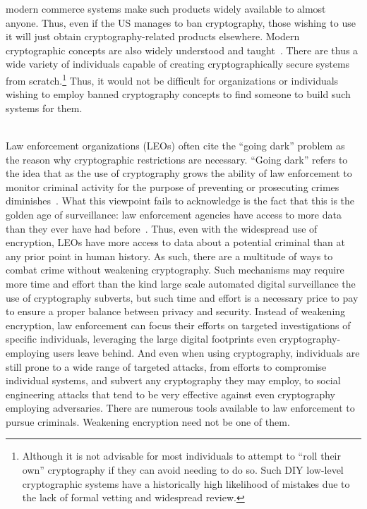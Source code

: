 \begin{packed_desc}
  modern commerce systems make such products widely available to
  almost anyone. Thus, even if the US manages to ban cryptography,
  those wishing to use it will just obtain cryptography-related
  products elsewhere. Modern cryptographic concepts are also widely
  understood and taught~\cite{schneier2010crypto}. There are thus a
  wide variety of individuals capable of creating cryptographically
  secure systems from scratch.\footnote{Although it is not advisable
    for most individuals to attempt to ``roll their own'' cryptography
    if they can avoid needing to do so. Such DIY low-level
    cryptographic systems have a historically high likelihood of
    mistakes due to the lack of formal vetting and widespread review.}
  Thus, it would not be difficult for organizations or individuals
  wishing to employ banned cryptography concepts to find someone
  to build such systems for them.
\item[Better Options] \hfill \\ Law enforcement organizations (LEOs)
  often cite the ``going dark'' problem as the reason why
  cryptographic restrictions are necessary. ``Going dark'' refers to
  the idea that as the use of cryptography grows the ability of law
  enforcement to monitor criminal activity for the purpose of
  preventing or prosecuting crimes
  diminishes~\cite{anderson2013}. What this viewpoint fails to
  acknowledge is the fact that this is the golden age of surveillance:
  law enforcement agencies have access to more data than they ever
  have had before~\cite{swire2011}. Thus, even with the widespread use
  of encryption, LEOs have more access to data about a potential
  criminal than at any prior point in human history. As such, there
  are a multitude of ways to combat crime without weakening
  cryptography. Such mechanisms may require more time and effort than
  the kind large scale automated digital surveillance the use of
  cryptography subverts, but such time and effort is a necessary price
  to pay to ensure a proper balance between privacy and
  security. Instead of weakening encryption, law enforcement can focus
  their efforts on targeted investigations of specific individuals,
  leveraging the large digital footprints even cryptography-employing
  users leave behind. And even when using cryptography, individuals
  are still prone to a wide range of targeted attacks, from efforts to
  compromise individual systems, and subvert any cryptography they may
  employ, to social engineering attacks that tend to be very effective
  against even cryptography employing adversaries. There are numerous
  tools available to law enforcement to pursue criminals. Weakening
  encryption need not be one of them.
\end{packed_desc}

